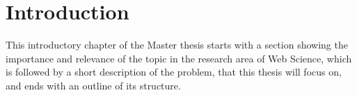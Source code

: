 
\chapter{Introduction} %
\label{cha:introduction}

This introductory chapter of the Master thesis starts with a section showing the importance and relevance of the topic in the research area of Web Science, which is followed by a short description of the problem, that this thesis will focus on, and ends with an outline of its structure.







